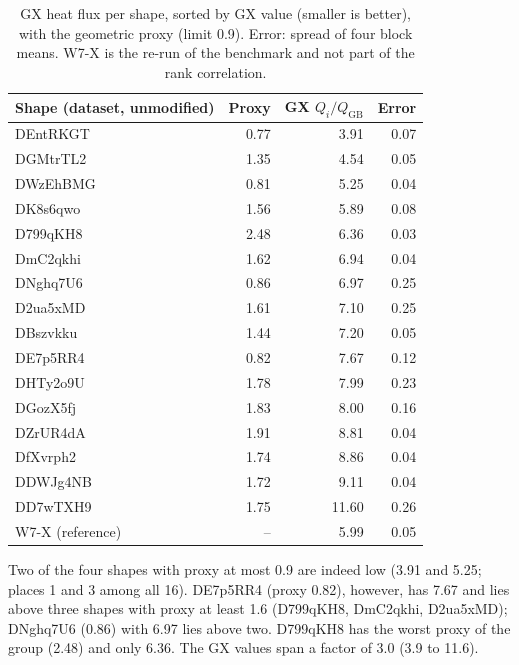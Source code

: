 \begin{table}[H]\centering\small
\begin{tabular}{lrrr}\toprule
Shape (dataset, unmodified) & Proxy & GX $Q_i/Q_{\mathrm{GB}}$ & Error\\\midrule
DEntRKGT & 0.77 & 3.91 & 0.07\\
DGMtrTL2 & 1.35 & 4.54 & 0.05\\
DWzEhBMG & 0.81 & 5.25 & 0.04\\
DK8s6qwo & 1.56 & 5.89 & 0.08\\
D799qKH8 & 2.48 & 6.36 & 0.03\\
DmC2qkhi & 1.62 & 6.94 & 0.04\\
DNghq7U6 & 0.86 & 6.97 & 0.25\\
D2ua5xMD & 1.61 & 7.10 & 0.25\\
DBszvkku & 1.44 & 7.20 & 0.05\\
DE7p5RR4 & 0.82 & 7.67 & 0.12\\
DHTy2o9U & 1.78 & 7.99 & 0.23\\
DGozX5fj & 1.83 & 8.00 & 0.16\\
DZrUR4dA & 1.91 & 8.81 & 0.04\\
DfXvrph2 & 1.74 & 8.86 & 0.04\\
DDWJg4NB & 1.72 & 9.11 & 0.04\\
DD7wTXH9 & 1.75 & 11.60 & 0.26\\\midrule
W7-X (reference) & -- & 5.99 & 0.05\\\bottomrule
\end{tabular}
\caption{GX heat flux per shape, sorted by GX value (smaller is better), with the geometric proxy (limit 0.9). Error: spread of four block means. W7-X is the re-run of the benchmark and not part of the rank correlation.}
\end{table}

Two of the four shapes with proxy at most 0.9 are indeed low (3.91 and 5.25; places 1 and 3 among all 16). DE7p5RR4 (proxy 0.82), however, has 7.67 and lies above three shapes with proxy at least 1.6 (D799qKH8, DmC2qkhi, D2ua5xMD); DNghq7U6 (0.86) with 6.97 lies above two.
D799qKH8 has the worst proxy of the group (2.48) and only 6.36. The GX values span a factor of 3.0 (3.9 to 11.6).

